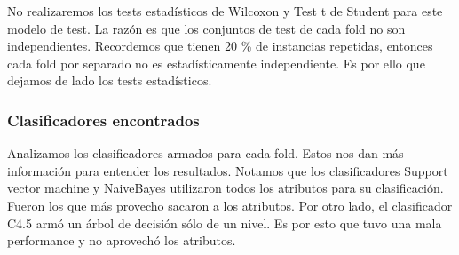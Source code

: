 No realizaremos los tests estadísticos de Wilcoxon y Test t de Student para este modelo de test. La razón es que los conjuntos de test de cada fold no son independientes. Recordemos que tienen 20 \% de instancias repetidas, entonces cada fold por separado no es estadísticamente independiente. Es por ello que dejamos de lado los tests estadísticos.

%
%
%

\subsubsection{Clasificadores encontrados}

Analizamos los clasificadores armados para cada fold. Estos nos dan más información para entender los resultados. Notamos que los clasificadores Support vector machine y NaiveBayes utilizaron todos los atributos para su clasificación. Fueron los que más provecho sacaron a los atributos. Por otro lado, el clasificador C4.5 armó un árbol de decisión sólo de un nivel. Es por esto que tuvo una mala performance y no aprovechó los atributos.

